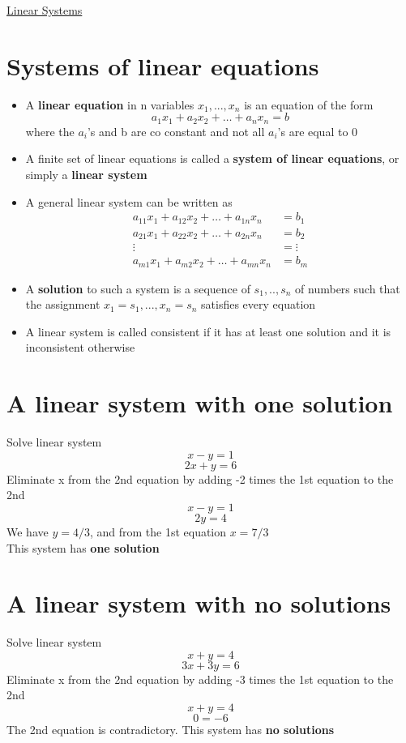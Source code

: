 \documentclass{article}[18pt]
\begin{document}
\begin{center}
\underline{\huge Linear Systems}
\end{center}
\section{Systems of linear equations}
\begin{itemize}
\item A \textbf{linear equation} in n variables $x_1,...,x_n$ is an equation of the form
$$a _ { 1 } x _ { 1 } + a _ { 2 } x _ { 2 } + \ldots + a _ { n } x _ { n } = b$$
where the $a_i$'s and b are co constant and not all $a_i$'s are equal to 0
\item A finite set of linear equations is called a \textbf{system of linear equations}, or simply a \textbf{linear system}
\item A general linear system can be written as
$$\begin{aligned} a _ { 11 } x _ { 1 } + a _ { 12 } x _ { 2 } + \ldots + a _ { 1 n } x _ { n } & = b _ { 1 } \\ a _ { 21 } x _ { 1 } + a _ { 22 } x _ { 2 } + \ldots + a _ { 2 n } x _ { n } & = b _ { 2 } \\ \vdots & = \vdots \\ a _ { m 1 } x _ { 1 } + a _ { m 2 } x _ { 2 } + \ldots + a _ { m n } x _ { n } & = b _ { m } \end{aligned}$$
\item A \textbf{solution} to such a system is a sequence of $s_1,..,s_n$ of numbers such that the assignment $x_1=s_1,...,x_n=s_n$ satisfies every equation
\item A linear system is called consistent if it has at least one solution and it is inconsistent otherwise
\end{itemize}
\section{A linear system with one solution}
Solve linear system
$$x-y=1$$
$$2x+y=6$$
Eliminate x from the 2nd equation by adding -2 times the 1st equation to the 2nd
$$x-y=1$$
$$2y=4$$
We have $y=4/3$, and from the 1st equation $x=7/3$\\
This system has \textbf{one solution}
\section{A linear system with no solutions}
Solve linear system
$$x+y=4$$
$$3x+3y=6$$
Eliminate x from the 2nd equation by adding -3 times the 1st equation to the 2nd
$$x+y=4$$
$$0=-6$$
The 2nd equation is contradictory. This system has \textbf{no solutions}
\end{document}
